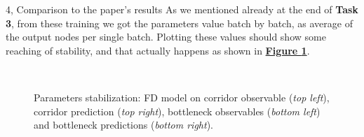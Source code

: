 \documentclass[10pt,a4paper]{article}
\begin{document}
\begin{task}{4, Comparison to the paper's results}
As we mentioned already at the end of \textbf{Task 3}, from these training we got the parameters value batch by batch, as average of the output nodes per single batch. Plotting these values should show some reaching of stability, and that actually happens as shown in \textbf{\hyperref[fig:various-fd-parameters]{Figure \ref{fig:various-fd-parameters}}}.

\begin{figure}[h]
    \centering
    \hfill
    \\
    \hfill
    \caption{Parameters stabilization: FD model on corridor observable (\textit{top left}), corridor prediction (\textit{top right}), bottleneck observables (\textit{bottom left}) and bottleneck predictions (\textit{bottom right}).}
    \label{fig:various-fd-parameters}
\end{figure}


\end{task}
\end{document}
